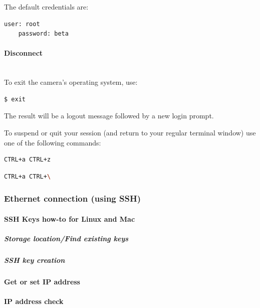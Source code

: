 The default credentials are: 

\begin{lstlisting}[language=bash,morekeywords=$,keywordstyle=\bfseries,frame=none,xleftmargin=.25in,belowskip=2em, aboveskip=2em]
    user: root
    password: beta
\end{lstlisting}


\paragraph{Disconnect}\mbox{}\\

To exit the camera's operating system, use: 

\begin{lstlisting}[language=bash,morekeywords=$,keywordstyle=\bfseries,frame=none,xleftmargin=.25in,belowskip=2em, aboveskip=2em]
$ exit
\end{lstlisting}

The result will be a logout message followed by a new login prompt.

To suspend or quit your  session (and return to your regular terminal window) use one of the following commands: 

\begin{lstlisting}[language=bash,morekeywords=$,keywordstyle=\bfseries,frame=none,xleftmargin=.25in,belowskip=2em, aboveskip=2em]
CTRL+a CTRL+z
\end{lstlisting}

\begin{lstlisting}[language=bash,morekeywords=$,keywordstyle=\bfseries,frame=none,xleftmargin=.25in,belowskip=2em, aboveskip=2em]
CTRL+a CTRL+\
\end{lstlisting}


\subsubsection{Ethernet connection (using SSH)}
\paragraph{SSH Keys how-to for Linux and Mac}
\subparagraph{Storage location/Find existing keys}
\subparagraph{SSH key creation}
\paragraph{Get or set IP address}
\paragraph{IP address check}
